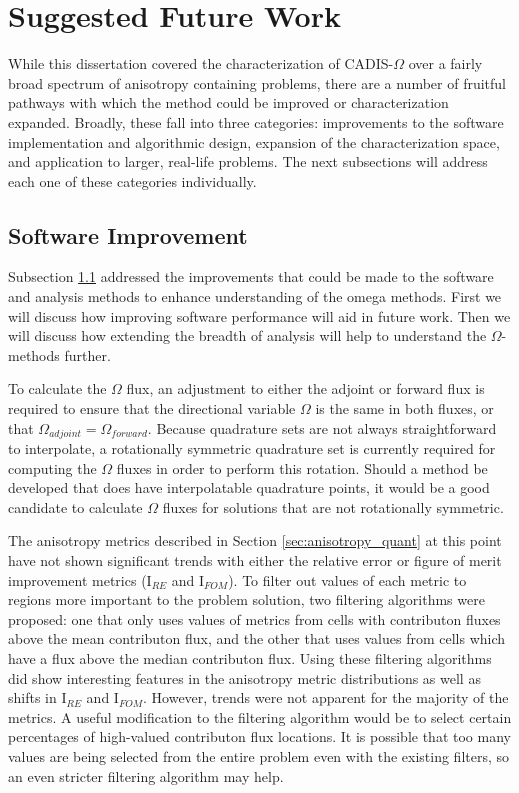 \section{Suggested Future Work}
\label{sec:futurewrk}

While this dissertation covered the characterization of CADIS-$\Omega$ over a
fairly broad spectrum of anisotropy containing problems, there are a number of
fruitful pathways with which the method could be improved or characterization
expanded. Broadly, these fall into three categories: improvements to the
software implementation and algorithmic design, expansion of the
characterization space, and application to larger, real-life problems. The next
subsections will address each one of these categories individually.

\subsection{Software Improvement}
\label{subsec:softwareimp}

Subsection \ref{subsec:softwareimp} addressed the improvements that could be
made to the software and analysis methods to enhance understanding of the omega
methods. First we will discuss how improving software performance will aid in
future work. Then we will discuss how extending the breadth of analysis will
help to understand the $\Omega$-methods further.

To calculate the $\Omega$ flux, an adjustment to either the adjoint or forward
flux is
required to ensure that the directional variable $\Omega$ is the same in both
fluxes, or that $\Omega_{adjoint} = \Omega_{forward}$. Because quadrature sets
are not always straightforward to interpolate, a rotationally symmetric
quadrature set is currently required for computing the $\Omega$ fluxes in order
to perform this rotation.
Should a method
be developed that does have interpolatable quadrature points, it would be a good
candidate to calculate $\Omega$ fluxes for solutions that are not
rotationally symmetric.

The anisotropy metrics described in Section \ref{sec:anisotropy_quant} at this
point have not shown significant trends with either the relative error or figure
of merit improvement metrics (I$_{RE}$ and I$_{FOM}$). To filter out values of
each metric to regions more important to the problem solution, two filtering
algorithms were proposed: one that only uses values of metrics from cells with
contributon fluxes above the mean contributon flux, and the other that uses
values from cells which have a flux above the median contributon flux. Using
these filtering algorithms did show interesting features in the anisotropy
metric distributions as well as shifts in I$_{RE}$ and I$_{FOM}$. However,
trends were not apparent for the majority of the metrics. A useful modification
to the filtering algorithm would be to select certain percentages of high-valued
contributon flux locations. It is possible that too many values are being
selected from the entire problem even with the existing filters, so an even
stricter filtering algorithm may help.

